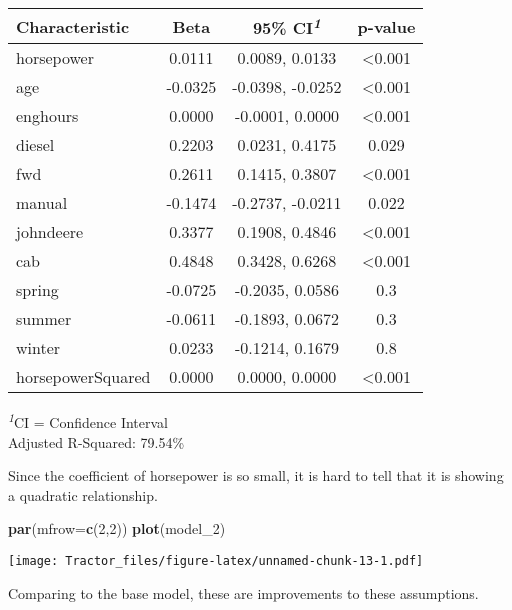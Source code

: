 \documentclass[
]{article}
\newenvironment{Shaded}{\begin{snugshade}}{\end{snugshade}}
\newcommand{\AttributeTok}[1]{\textcolor[rgb]{0.13,0.29,0.53}{#1}}
\newcommand{\DecValTok}[1]{\textcolor[rgb]{0.00,0.00,0.81}{#1}}
\newcommand{\FunctionTok}[1]{\textcolor[rgb]{0.13,0.29,0.53}{\textbf{#1}}}
\newcommand{\NormalTok}[1]{#1}
\begin{document}
\begingroup
\fontsize{12.0pt}{14.4pt}\selectfont
\setlength{\LTpost}{0mm}
\begin{longtable}{lccc}
\toprule
\textbf{Characteristic} & \textbf{Beta} & \textbf{95\% CI}\textsuperscript{\textit{1}} & \textbf{p-value} \\ 
\midrule\addlinespace[2.5pt]
horsepower & 0.0111 & 0.0089, 0.0133 & <0.001 \\ 
age & -0.0325 & -0.0398, -0.0252 & <0.001 \\ 
enghours & 0.0000 & -0.0001, 0.0000 & <0.001 \\ 
diesel & 0.2203 & 0.0231, 0.4175 & 0.029 \\ 
fwd & 0.2611 & 0.1415, 0.3807 & <0.001 \\ 
manual & -0.1474 & -0.2737, -0.0211 & 0.022 \\ 
johndeere & 0.3377 & 0.1908, 0.4846 & <0.001 \\ 
cab & 0.4848 & 0.3428, 0.6268 & <0.001 \\ 
spring & -0.0725 & -0.2035, 0.0586 & 0.3 \\ 
summer & -0.0611 & -0.1893, 0.0672 & 0.3 \\ 
winter & 0.0233 & -0.1214, 0.1679 & 0.8 \\ 
horsepowerSquared & 0.0000 & 0.0000, 0.0000 & <0.001 \\ 
\bottomrule
\end{longtable}
\begin{minipage}{\linewidth}
\textsuperscript{\textit{1}}CI = Confidence Interval\\
Adjusted R-Squared: 79.54\%\\
\end{minipage}
\endgroup

Since the coefficient of horsepower is so small, it is hard to tell that
it is showing a quadratic relationship.

\begin{Shaded}
\begin{Highlighting}[]
\FunctionTok{par}\NormalTok{(}\AttributeTok{mfrow=}\FunctionTok{c}\NormalTok{(}\DecValTok{2}\NormalTok{,}\DecValTok{2}\NormalTok{))}
\FunctionTok{plot}\NormalTok{(model\_2)}
\end{Highlighting}
\end{Shaded}

\texttt{[image: Tractor\_files/figure-latex/unnamed-chunk-13-1.pdf]}

Comparing to the base model, these are improvements to these
assumptions.
\end{document}
